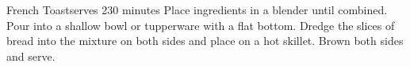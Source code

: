 \begin{recipe}{French Toast}{serves 2}{30 minutes}
 Place ingredients in a blender until combined.  Pour into a shallow bowl or tupperware with a flat bottom.  Dredge the slices of bread into the mixture on both sides and place on a hot skillet.  Brown both sides and serve.

\end{recipe}

